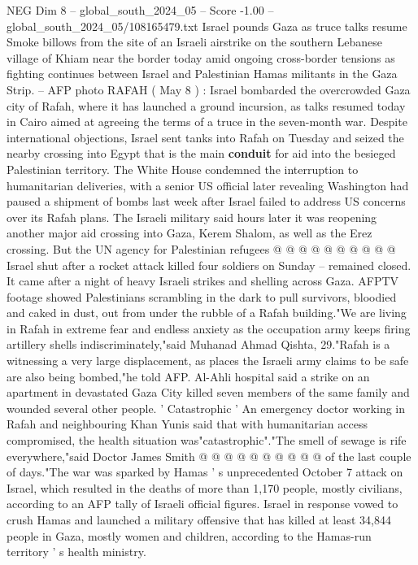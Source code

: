 \begin{textsample}{NEG Dim 8 – global\_south\_2024\_05 – Score -1.00 – global\_south\_2024\_05/108165479.txt}  \label{ex:f8_neg_106}
Israel pounds Gaza as truce talks resume Smoke billows from the site of an Israeli airstrike on the southern Lebanese village of Khiam near the border today amid ongoing cross-border tensions as fighting continues between Israel and Palestinian Hamas militants in the Gaza Strip. -- AFP photo RAFAH ( May 8 ) : Israel bombarded the overcrowded Gaza city of Rafah, where it has launched a ground incursion, as talks resumed today in Cairo aimed at agreeing the terms of a truce in the seven-month war.
Despite international objections, Israel sent tanks into Rafah on Tuesday and seized the nearby crossing into Egypt that is the main \textbf{conduit} for aid into the besieged Palestinian territory.
The White House condemned the interruption to humanitarian deliveries, with a senior US official later revealing Washington had paused a shipment of bombs last week after Israel failed to address US concerns over its Rafah plans.
The Israeli military said hours later it was reopening another major aid crossing into Gaza, Kerem Shalom, as well as the Erez crossing.
But the UN agency for Palestinian refugees @ @ @ @ @ @ @ @ @ @ Israel shut after a rocket attack killed four soldiers on Sunday -- remained closed.
It came after a night of heavy Israeli strikes and shelling across Gaza.
AFPTV footage showed Palestinians scrambling in the dark to pull survivors, bloodied and caked in dust, out from under the rubble of a Rafah building."We are living in Rafah in extreme fear and endless anxiety as the occupation army keeps firing artillery shells indiscriminately,"said Muhanad Ahmad Qishta, 29."Rafah is a witnessing a very large displacement, as places the Israeli army claims to be safe are also being bombed,"he told AFP.
Al-Ahli hospital said a strike on an apartment in devastated Gaza City killed seven members of the same family and wounded several other people. ' Catastrophic ' An emergency doctor working in Rafah and neighbouring Khan Yunis said that with humanitarian access compromised, the health situation was"catastrophic"."The smell of sewage is rife everywhere,"said Doctor James Smith @ @ @ @ @ @ @ @ @ @ of the last couple of days."The war was sparked by Hamas ' s unprecedented October 7 attack on Israel, which resulted in the deaths of more than 1,170 people, mostly civilians, according to an AFP tally of Israeli official figures.
Israel in response vowed to crush Hamas and launched a military offensive that has killed at least 34,844 people in Gaza, mostly women and children, according to the Hamas-run territory ' s health ministry.

\end{textsample}

